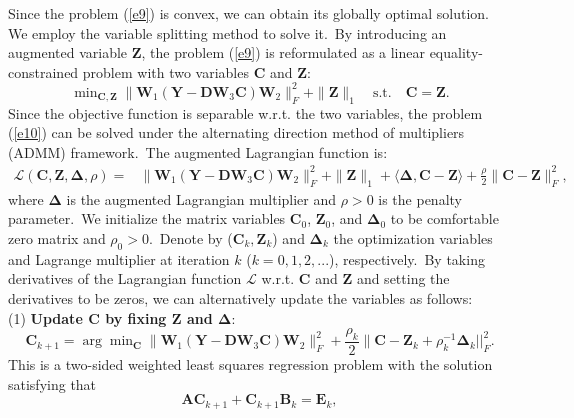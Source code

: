 Since the problem (\ref{e9}) is convex, we can obtain its globally optimal solution. We employ the variable splitting method \cite{Eckstein1992} to solve it.\ By introducing an augmented variable $\bm{Z}$, the problem (\ref{e9}) is reformulated as a linear equality-constrained problem with two variables $\bm{C}$ and $\bm{Z}$:
\begin{equation}
\label{e10}
\min\nolimits_{\bm{C},\bm{Z}}\|\bm{W}_{1}(\bm{Y}-\bm{D}\bm{W}_{3}\bm{C})\bm{W}_{2}\|_{F}^{2}
+
\|\bm{Z}\|_{1}
\quad
\text{s.t.}
\quad
\bm{C}=\bm{Z}.
\end{equation}
Since the objective function is separable w.r.t. the two variables, the problem (\ref{e10}) can be solved under the alternating direction method of multipliers (ADMM) \cite{admm} framework.\ The augmented Lagrangian function is:
\begin{equation}
\label{e11}
\begin{split}
\mathcal{L}(\bm{C},\bm{Z},\bm{\Delta},\rho)
=
&\|\bm{W}_{1}(\bm{Y}-\bm{D}\bm{W}_{3}\bm{C})\bm{W}_{2}\|_{F}^{2}
+
\|\bm{Z}\|_{1}
+
\langle
\bm{\Delta},\bm{C}-\bm{Z}
\rangle
+
\frac{\rho}{2}
\|\bm{C}-\bm{Z}\|_{F}^{2},
\end{split}
\end{equation}
where $\bm{\Delta}$ is the augmented Lagrangian multiplier and $\rho>0$ is the penalty parameter.\ We initialize the matrix variables $\bm{C}_{0}$, $\bm{Z}_{0}$, and $\bm{\Delta}_{0}$ to be comfortable zero matrix and $\rho_{0}>0$.\ Denote by ($\bm{C}_{k}, \bm{Z}_{k}$) and $\bm{\Delta}_{k}$ the optimization variables and Lagrange multiplier at iteration $k$ ($k=0,1,2,...$), respectively.\ By taking derivatives of the Lagrangian function $\mathcal{L}$ w.r.t. $\bm{C}$ and $\bm{Z}$ and setting the derivatives to be zeros, we can alternatively update the variables as follows:
\vspace{2mm}
\\
(1) \textbf{Update $\bm{C}$ by fixing $\bm{Z}$ and $\bm{\Delta}$}:
\begin{equation}
\label{e12}
\bm{C}_{k+1}
=
\arg\min\nolimits_{\bm{C}}
\|\bm{W}_{1}(\bm{Y}-\bm{D}\bm{W}_{3}\bm{C})\bm{W}_{2}\|_{F}^{2} 
+
\frac{\rho_{k}}{2}\|\bm{C} - \bm{Z}_{k} + \rho_{k}^{-1}\bm{\Delta}_{k}||_{F}^{2}.
\end{equation}
This is a two-sided weighted least squares regression problem with the solution satisfying that
\begin{equation}
\label{e13}
\bm{A}\bm{C}_{k+1}
+
\bm{C}_{k+1}\bm{B}_{k}
=
\bm{E}_{k},
\end{equation}
